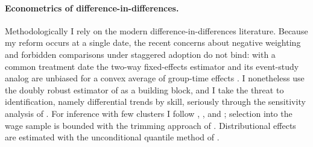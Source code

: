 \paragraph{Econometrics of difference-in-differences.} Methodologically I rely on the modern difference-in-differences literature. Because my reform occurs at a single date, the recent concerns about negative weighting and forbidden comparisons under staggered adoption \citep{goodmanbacon_2021, dechaisemartin_2020, sun_abraham_2021, callaway_santanna_2021} do not bind: with a common treatment date the two-way fixed-effects estimator and its event-study analog are unbiased for a convex average of group-time effects \citep{roth_2023_trending, baker_larcker_wang_2022}. I nonetheless use the doubly robust estimator of \citet{santanna_zhao_2020} as a building block, and I take the threat to identification, namely differential trends by skill, seriously through the sensitivity analysis of \citet{rambachan_roth_2023}. For inference with few clusters I follow \citet{bertrand_2004}, \citet{cameron_2008_bootstrap}, and \citet{pustejovsky_tipton_2018}; selection into the wage sample is bounded with the trimming approach of \citet{lee_2009}. Distributional effects are estimated with the unconditional quantile method of \citet{firpo_fortin_lemieux_2009}.
